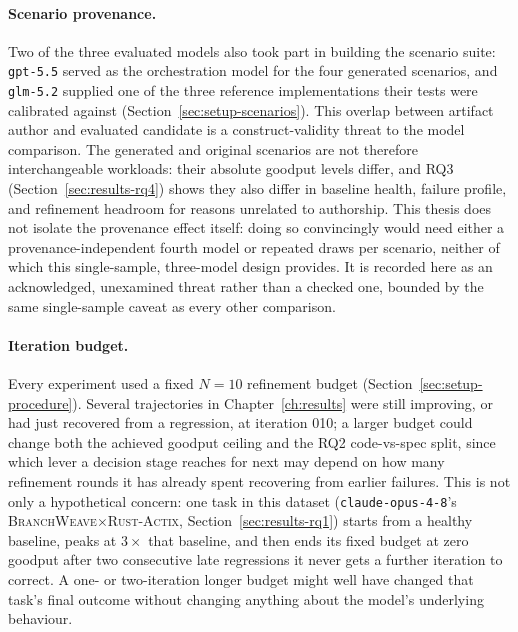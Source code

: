 \paragraph{Scenario provenance.} Two of the three evaluated models also
took part in building the scenario suite: \texttt{gpt-5.5} served as the
orchestration model for the four generated scenarios, and
\texttt{glm-5.2} supplied one of the three reference implementations their
tests were calibrated against (Section~\ref{sec:setup-scenarios}). This
overlap between artifact author and evaluated candidate is a
construct-validity threat to the model comparison.
The generated and original scenarios are not therefore interchangeable
workloads: their absolute goodput levels differ, and RQ3
(Section~\ref{sec:results-rq4}) shows they also differ in baseline health,
failure profile, and refinement headroom for reasons unrelated to
authorship. This thesis does not isolate the provenance effect itself: doing
so convincingly would need either a provenance-independent fourth model or
repeated draws per scenario, neither of which this single-sample,
three-model design provides. It is recorded here as an acknowledged,
unexamined threat rather than a checked one, bounded by the same
single-sample caveat as every other comparison.

\paragraph{Iteration budget.} Every experiment used a fixed $N{=}10$
refinement budget (Section~\ref{sec:setup-procedure}). Several
trajectories in Chapter~\ref{ch:results} were still improving, or had just
recovered from a regression, at iteration 010; a larger budget could
change both the achieved goodput ceiling and the RQ2 code-vs-spec split,
since which lever a decision stage reaches for next may depend on how many
refinement rounds it has already spent recovering from earlier failures.
This is not only a hypothetical concern: one task in this dataset
(\texttt{claude-opus-4-8}'s \textsc{BranchWeave}$\times$\textsc{Rust-Actix},
Section~\ref{sec:results-rq1}) starts from a healthy baseline, peaks at
$3\times$ that baseline, and then ends its fixed budget at zero goodput
after two consecutive late regressions it never gets a further iteration
to correct. A one- or two-iteration longer budget might well have changed
that task's final outcome without changing anything about the model's
underlying behaviour.

